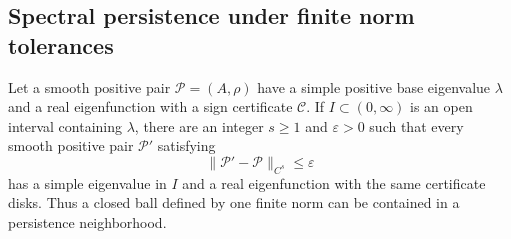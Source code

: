 \subsection{Spectral persistence under finite norm tolerances}

\begin{lemma}\label{lem:persistence}
Let a smooth positive pair $\mathcal P=(A,\rho)$ have a simple
positive base eigenvalue $\lambda$ and a real eigenfunction with a
sign certificate $\mathcal C$. If $I\subset(0,\infty)$ is an open
interval containing $\lambda$, there are an integer $s\ge1$ and
$\varepsilon>0$ such that every smooth positive pair
$\mathcal P'$ satisfying
\[
 \lVert\mathcal P'-\mathcal P\rVert_{C^s}\le\varepsilon
\]
has a simple eigenvalue in $I$ and a real eigenfunction with the
same certificate disks. Thus a closed ball defined by one finite
norm can be contained in a persistence neighborhood.
\end{lemma}

